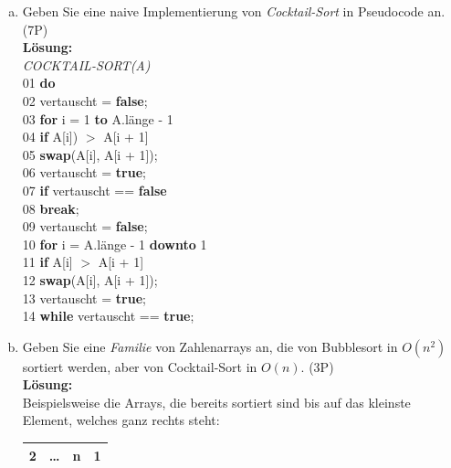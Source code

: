 \documentclass{scrartcl}
\begin{document}
\begin{enumerate}[(1)]
\begin{enumerate}[(a)]
\item Geben Sie eine naive Implementierung von \emph{Cocktail-Sort} in Pseudocode an. (7P)\\
\textbf{Lösung:}\\
\textit{COCKTAIL-SORT(A)}\\
01 \tab \textbf{do} \\
02 \tab \tab vertauscht = \textbf{false};\\
03 \tab \tab \textbf{for} i = 1 \textbf{to} A.länge - 1\\
04 \tab \tab \tab \textbf{if} A[i]) $>$ A[i + 1]\\
05 \tab \tab \tab \tab \textbf{swap}(A[i], A[i + 1]);\\
06 \tab \tab \tab \tab vertauscht = \textbf{true};\\
07 \tab \tab \textbf{if} vertauscht == \textbf{false}\\
08 \tab \tab \tab \textbf{break};\\
09 \tab \tab vertauscht = \textbf{false};\\
10 \tab \tab \textbf{for} i = A.länge - 1 \textbf{downto} 1\\
11 \tab \tab \tab \textbf{if} A[i] $>$ A[i + 1]\\
12 \tab \tab \tab \tab \textbf{swap}(A[i], A[i + 1]);\\
13 \tab \tab \tab \tab vertauscht = \textbf{true};\\
14 \tab \textbf{while} vertauscht == \textbf{true};
\item Geben Sie eine \emph{Familie} von Zahlenarrays an, die von Bubblesort in $O(n^2)$ sortiert werden, aber von Cocktail-Sort in $O(n)$. (3P)\\
\textbf{Lösung:}\\
Beispielsweise die Arrays, die bereits sortiert sind bis auf das kleinste Element, welches ganz rechts steht:
\text{ } \\
\begin{center}
\begin{tabular}{|c|c|c|c|}
\hline
2 & \ldots & n & 1 \\
\hline
\end{tabular}
\end{center}
\end{enumerate}
\end{enumerate}
\pagebreak
\end{document}

